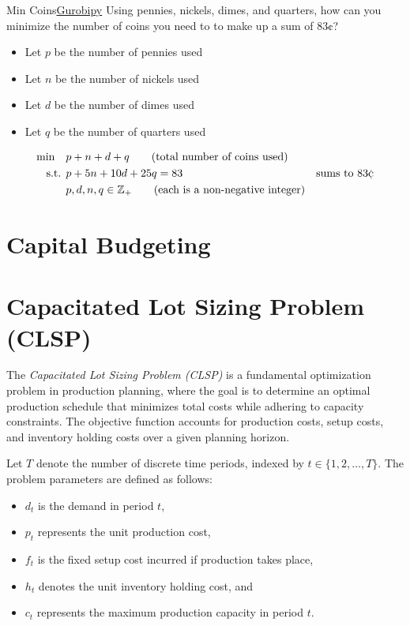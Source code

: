 \begin{examplewithcode}{Min Coins}{\href{https://github.com/open-optimization/open-optimization-or-examples/blob/master/integer-programming/coins-minimize-problem.ipynb}{Gurobipy}}
\label{ex:min-coins}
Using pennies, nickels, dimes, and quarters, how can you minimize the number of coins you need to to make up a sum of $83\cent$? 

\begin{itemize}
\item Let $p$ be the number of pennies used
\item Let $n$ be the number of nickels used
\item Let $d$ be the number of dimes used
\item Let $q$ be the number of quarters used
\end{itemize}
\begin{align*}
\min \quad & p + n + d + q   \tag{total number of coins used} \\
\st        & p + 5n + 10d + 25 q = 83 & \text{sums to } 83 \cent \\
& p,d,n,q \in \Z_+   \tag{each is a non-negative integer}
\end{align*}
\end{examplewithcode}

\section{Capital Budgeting}



\section{Capacitated Lot Sizing Problem (CLSP)}

The \textit{Capacitated Lot Sizing Problem (CLSP)} is a fundamental optimization problem in production planning, where the goal is to determine an optimal production schedule that minimizes total costs while adhering to capacity constraints. The objective function accounts for production costs, setup costs, and inventory holding costs over a given planning horizon.

Let \( T \) denote the number of discrete time periods, indexed by \( t \in \{1,2,\dots,T\} \). The problem parameters are defined as follows:
\begin{itemize}
    \item \( d_t \) is the demand in period \( t \),
    \item \( p_t \) represents the unit production cost,
    \item \( f_t \) is the fixed setup cost incurred if production takes place,
    \item \( h_t \) denotes the unit inventory holding cost, and
    \item \( c_t \) represents the maximum production capacity in period \( t \).
\end{itemize}

